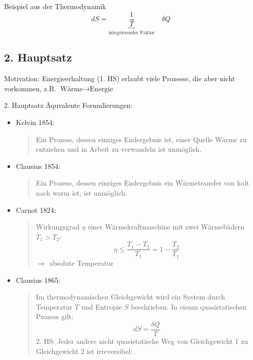 \begin{beispiel}{Beispiel aus der Thermodynamik}
    \begin{equation}
        dS = \underbrace{\frac{1}{T}}_{\text{integrierender Faktor}} \quad \delta Q
    \end{equation}
\end{beispiel}


\subsection{2. Hauptsatz}
Motivation: Energieerhaltung (1. HS) erlaubt viele Prozesse, die aber nicht vorkommen, z.B. $\text{Wärme} \longrightarrow \text{Energie}$

\begin{definition}{2. Hauptsatz}
    Äquvalente Formulierungen:
    \begin{itemize}
        \item Kelvin 1854:
        \begin{quote}
            Ein Prozess, dessen einziges Endergebnis ist, einer Quelle Wärme zu entziehen und in Arbeit zu verwandeln ist unmöglich.
        \end{quote}
        \item Clausius 1854:
        \begin{quote}
            Ein Prozess, dessen einziges Endergebnis ein Wärmetransfer von kalt nach warm ist, ist unmöglich.
        \end{quote}
        \item Carnot 1824:
        \begin{quote}
            Wirkungsgrad $\eta$ einer Wärmekraftmaschine mit zwei Wärmebädern $T_1 > T_2$:
            \begin{equation}
                \eta \leq \frac{T_1-T_2}{T_1} = 1- \frac{T_2}{T_1} 
            \end{equation}$\Longrightarrow$ absolute Temperatur
        \end{quote}
        \item Clausius 1865:
        \begin{quote}
            Im thermodynamischen Gleichgewicht wird ein System durch Temperatur $T$ und Entropie $S$ beschrieben. In eienm quasistatischen Prozess gilt:
            \begin{equation}
                dS = \frac{\delta Q}{T}
            \end{equation}
            2. HS: Jeder andere nicht quasistatische Weg von Gleichgewicht 1 zu Gleichgewicht 2 ist irreversibel:

\end{quote}
\end{itemize}
\end{definition}

